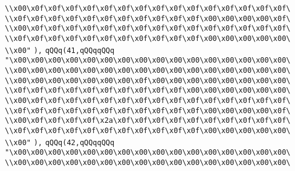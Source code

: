 \verb|\\x00\x0f\x0f\x0f\x0f\x0f\x0f\x0f\x0f\x0f\x0f\x0f\x0f\x0f\x0f\x0f\|\newline
\verb|\\x0f\x0f\x0f\x0f\x0f\x0f\x0f\x0f\x0f\x0f\x0f\x00\x00\x00\x00\x0f\|\newline
\verb|\\x00\x0f\x0f\x0f\x0f\x0f\x0f\x0f\x0f\x0f\x0f\x0f\x0f\x0f\x0f\x0f\|\newline
\verb|\\x0f\x0f\x0f\x0f\x0f\x0f\x0f\x0f\x0f\x0f\x0f\x00\x00\x00\x00\x00\|\newline
\verb|\\x00"|\newline
\verb|),|\newline
\verb|qQQq(41,qQQqqQQq|\newline
\verb|"\x00\x00\x00\x00\x00\x00\x00\x00\x00\x00\x00\x00\x00\x00\x00\x00\|\newline
\verb|\\x00\x00\x00\x00\x00\x00\x00\x00\x00\x00\x00\x00\x00\x00\x00\x00\|\newline
\verb|\\x00\x00\x00\x00\x00\x00\x00\x0f\x00\x00\x00\x00\x00\x00\x00\x00\|\newline
\verb|\\x0f\x0f\x0f\x0f\x0f\x0f\x0f\x0f\x0f\x0f\x00\x00\x00\x00\x00\x00\|\newline
\verb|\\x00\x0f\x0f\x0f\x0f\x0f\x0f\x0f\x0f\x0f\x0f\x0f\x0f\x0f\x0f\x0f\|\newline
\verb|\\x0f\x0f\x0f\x0f\x0f\x0f\x0f\x0f\x0f\x0f\x0f\x00\x00\x00\x00\x0f\|\newline
\verb|\\x00\x0f\x0f\x0f\x0f\x2a\x0f\x0f\x0f\x0f\x0f\x0f\x0f\x0f\x0f\x0f\|\newline
\verb|\\x0f\x0f\x0f\x0f\x0f\x0f\x0f\x0f\x0f\x0f\x0f\x00\x00\x00\x00\x00\|\newline
\verb|\\x00"|\newline
\verb|),|\newline
\verb|qQQq(42,qQQqqQQq|\newline
\verb|"\x00\x00\x00\x00\x00\x00\x00\x00\x00\x00\x00\x00\x00\x00\x00\x00\|\newline
\verb|\\x00\x00\x00\x00\x00\x00\x00\x00\x00\x00\x00\x00\x00\x00\x00\x00\|\newline
